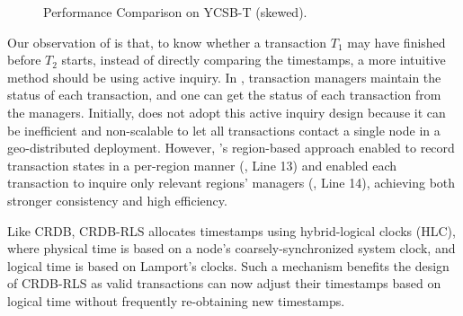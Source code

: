 \begin{figure}[t]
	\centering
	\caption{Performance Comparison on YCSB-T (skewed).}\label{fig:crdb:eval:ycsb}
\end{figure}

Our observation of \crdbxx is that, to know whether a transaction $T_1$ may have finished before $T_2$ starts, instead of directly comparing the timestamps, a more intuitive method should be using active inquiry. In \crdb, transaction managers maintain the status of each transaction, and one can get the status of each transaction from the managers. Initially, \crdb does not adopt this active inquiry design because it can be inefficient and non-scalable to let all transactions contact a single node in a geo-distributed deployment. However, \xxcons's region-based approach enabled \crdb to record transaction states in a per-region manner (, Line 13) and enabled each transaction to inquire only relevant regions' managers (, Line 14), achieving both stronger consistency and high efficiency.

Like CRDB, CRDB-RLS allocates timestamps using hybrid-logical clocks (HLC), where physical time is
based on a node’s coarsely-synchronized system clock, and logical time is based on Lamport’s clocks. Such a mechanism benefits the design of CRDB-RLS as valid transactions can now adjust their timestamps based on logical time without frequently re-obtaining new timestamps.


